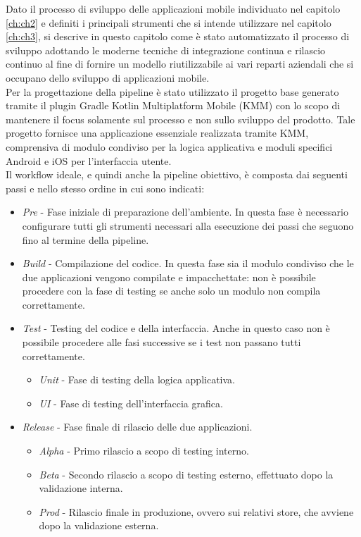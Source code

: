 
Dato il processo di sviluppo delle applicazioni mobile individuato nel capitolo \ref{ch:ch2} e definiti i principali strumenti che si intende utilizzare nel capitolo \ref{ch:ch3}, si descrive in questo capitolo come è stato automatizzato il processo di sviluppo adottando le moderne tecniche di integrazione continua e rilascio continuo al fine di fornire un modello riutilizzabile ai vari reparti aziendali che si occupano dello sviluppo di applicazioni mobile.\\
Per la progettazione della pipeline è stato utilizzato il progetto base generato tramite il plugin Gradle Kotlin Multiplatform Mobile (KMM) con lo scopo di mantenere il focus solamente sul processo e non sullo sviluppo del prodotto. Tale progetto fornisce una applicazione essenziale realizzata tramite KMM, comprensiva di modulo condiviso per la logica applicativa e moduli specifici Android e iOS per l'interfaccia utente.\\
Il workflow ideale, e quindi anche la pipeline obiettivo, è composta dai seguenti passi e nello stesso ordine in cui sono indicati:
\begin{itemize}
    \item \textit{Pre} - Fase iniziale di preparazione dell'ambiente. In questa fase è necessario configurare tutti gli strumenti necessari alla esecuzione dei passi che seguono fino al termine della pipeline.
    \item \textit{Build} - Compilazione del codice. In questa fase sia il modulo condiviso che le due applicazioni vengono compilate e impacchettate: non è possibile procedere con la fase di testing se anche solo un modulo non compila correttamente.
    \item \textit{Test} - Testing del codice e della interfaccia. Anche in questo caso non è possibile procedere alle fasi successive se i test non passano tutti correttamente.
    \begin{itemize}
        \item \textit{Unit} - Fase di testing della logica applicativa.
        \item \textit{UI} - Fase di testing dell'interfaccia grafica.
    \end{itemize}
    \item \textit{Release} - Fase finale di rilascio delle due applicazioni.
    \begin{itemize}
        \item \textit{Alpha} - Primo rilascio a scopo di testing interno.
        \item \textit{Beta} - Secondo rilascio a scopo di testing esterno, effettuato dopo la validazione interna.
        \item \textit{Prod} - Rilascio finale in produzione, ovvero sui relativi store, che avviene dopo la validazione esterna.
    \end{itemize}
\end{itemize}

